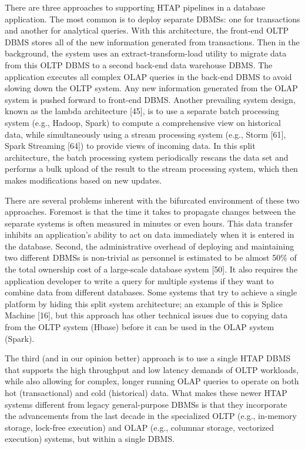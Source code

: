 \documentclass[a4paper,12pt,notitlepage,twoside,openright]{article}
\begin{document}
There are three approaches to supporting HTAP pipelines in a database
application. The most common is to deploy separate DBMSs: one for
transactions and another for analytical queries. With this architecture,
the front-end OLTP DBMS stores all of the new information generated from
transactions. Then in the background, the system uses an
extract-transform-load utility to migrate data from this OLTP DBMS to a
second back-end data warehouse DBMS. The application executes all
complex OLAP queries in the back-end DBMS to avoid slowing down the OLTP
system. Any new information generated from the OLAP system is pushed
forward to front-end DBMS. Another prevailing system design, known as
the lambda architecture {[}45{]}, is to use a separate batch processing
system (e.g., Hadoop, Spark) to compute a comprehensive view on
historical data, while simultaneously using a stream processing system
(e.g., Storm {[}61{]}, Spark Streaming {[}64{]}) to provide views of
incoming data. In this split architecture, the batch processing system
periodically rescans the data set and performs a bulk upload of the
result to the stream processing system, which then makes modifications
based on new updates.

There are several problems inherent with the bifurcated environment of
these two approaches. Foremost is that the time it takes to propagate
changes between the separate systems is often measured in minutes or
even hours. This data transfer inhibits an application's ability to act
on data immediately when it is entered in the database. Second, the
administrative overhead of deploying and maintaining two different DBMSs
is non-trivial as personnel is estimated to be almost 50\% of the total
ownership cost of a large-scale database system {[}50{]}. It also
requires the application developer to write a query for multiple systems
if they want to combine data from different databases. Some systems that
try to achieve a single platform by hiding this split system
architecture; an example of this is Splice Machine {[}16{]}, but this
approach has other technical issues due to copying data from the OLTP
system (Hbase) before it can be used in the OLAP system (Spark).

The third (and in our opinion better) approach is to use a single HTAP
DBMS that supports the high throughput and low latency demands of OLTP
workloads, while also allowing for complex, longer running OLAP queries
to operate on both hot (transactional) and cold (historical) data. What
makes these newer HTAP systems different from legacy general-purpose
DBMSs is that they incorporate the advancements from the last decade in
the specialized OLTP (e.g., in-memory storage, lock-free execution) and
OLAP (e.g., columnar storage, vectorized execution) systems, but within
a single DBMS.
\end{document}
